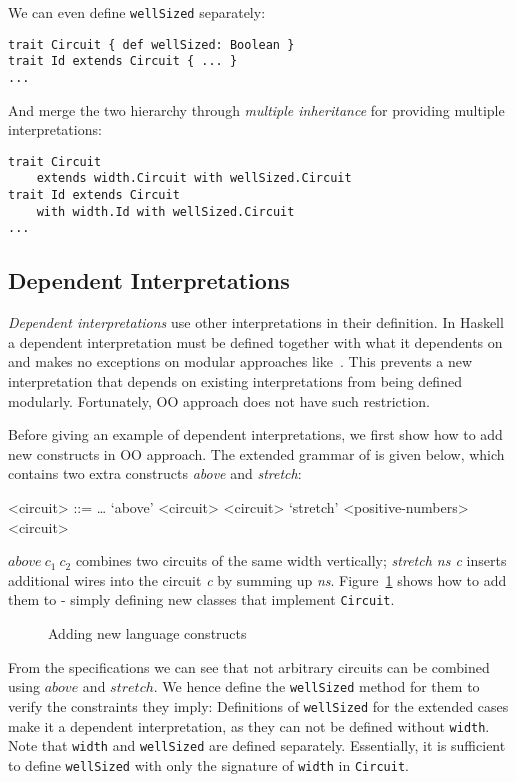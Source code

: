 We can even define \lstinline{wellSized} separately:
\begin{lstlisting}
trait Circuit { def wellSized: Boolean }
trait Id extends Circuit { ... }
...
\end{lstlisting}
And merge the two hierarchy through \emph{multiple inheritance} for providing
multiple interpretations:
\begin{lstlisting}
trait Circuit
    extends width.Circuit with wellSized.Circuit
trait Id extends Circuit
    with width.Id with wellSized.Circuit
...
\end{lstlisting}

\subsection{Dependent Interpretations}
 \emph{Dependent interpretations} use other interpretations in their definition.
In Haskell a dependent interpretation must be defined together with what it
dependents on and makes no exceptions on modular approaches like~\cite{}.
This prevents a new interpretation that depends on existing
interpretations from being defined modularly.
Fortunately, OO approach does not have such restriction.

Before giving an example of dependent interpretations, we first show how to add new
constructs in OO approach. The extended grammar of \dsl is given below,
which contains two extra constructs \emph{above} and \emph{stretch}:
\setlength{\grammarindent}{5em} %
\begin{grammar}
<circuit> ::= \ldots
\alt `above' <circuit> <circuit>
\alt `stretch' <positive-numbers> <circuit>
\end{grammar}
$above\ c_1\ c_2$ combines two circuits of the same width vertically;
\emph{stretch ns c} inserts additional wires into the circuit \emph{c} by
summing up \emph{ns}.
Figure~\ref{code:variant} shows how to add them to \dsl - simply defining new classes that implement \lstinline{Circuit}.
\begin{figure}
\caption{Adding new language constructs}
\label{code:variant}
\end{figure}

From the specifications we can see that not arbitrary circuits can be combined using $above$ and $stretch$.
We hence define the \lstinline{wellSized} method for them to
verify the constraints they imply:
Definitions of \lstinline{wellSized} for the extended cases make it a dependent
interpretation, as they can not be defined without \lstinline{width}.
Note that \lstinline{width} and \lstinline{wellSized} are defined separately.
Essentially, it is sufficient to define \lstinline{wellSized} with only the signature of \lstinline{width} in \lstinline{Circuit}.


